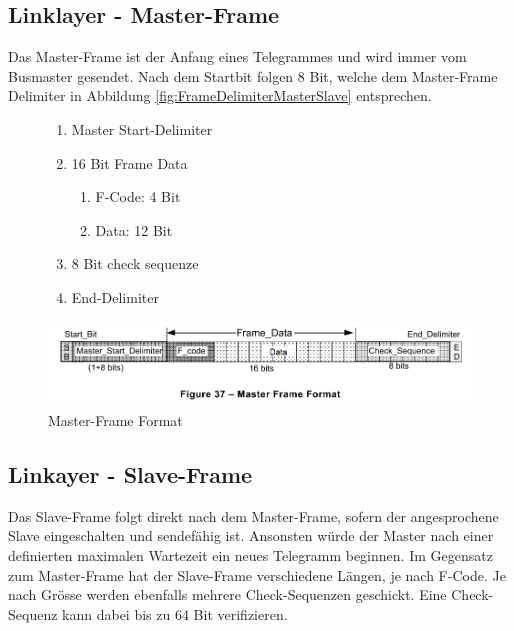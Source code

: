 
\subsection{Linklayer - Master-Frame}
\label{sub:MasterFrame}
Das Master-Frame ist der Anfang eines Telegrammes und wird immer vom Busmaster gesendet. Nach dem Startbit folgen 8 Bit, welche dem Master-Frame Delimiter in Abbildung \ref{fig:FrameDelimiterMasterSlave} entsprechen. 

\begin{figure}[H]
    \centering
    \begin{minipage}{0.33 \textwidth}
        \centering
        \begin{enumerate}
            \item Master Start-Delimiter
            \item 16 Bit Frame Data
            \begin{enumerate}
                \item F-Code: 4 Bit
                \item Data: 12 Bit
            \end{enumerate}
            \item 8 Bit check sequenze 
            \item End-Delimiter
        \end{enumerate}
    \end{minipage}
    \hfill
    \begin{minipage}{0.65 \textwidth}
        \includegraphics[width = \textwidth]{Figures/Chap2/Grundlagen/MVB_DOKU/Frames und Telegramme/Fig37_MasterFrameFormat.png}
        \caption{Master-Frame Format}
        \label{fig:MasterFrameFormat}
    \end{minipage}
        
\end{figure}

\subsection{Linkayer - Slave-Frame}
\label{sub:SlaveFrame}
Das Slave-Frame folgt direkt nach dem Master-Frame, sofern der angesprochene Slave eingeschalten und sendefähig ist. Ansonsten würde der Master nach einer definierten maximalen Wartezeit ein neues Telegramm beginnen. \newline
Im Gegensatz zum Master-Frame hat der Slave-Frame verschiedene Längen, je nach F-Code. Je nach Grösse werden ebenfalls mehrere Check-Sequenzen geschickt. Eine Check-Sequenz kann dabei bis zu 64 Bit verifizieren.

